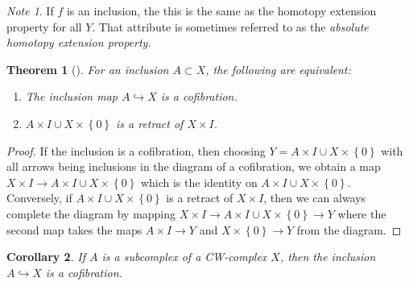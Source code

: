 \documentclass[reqno]{amsart}
\newtheorem{theorem}{Theorem}[section]
\newtheorem{corollary}[theorem]{Corollary}
\theoremstyle{definition}
\theoremstyle{remark}
\newtheorem*{note}{Note}
\begin{document}
\begin{note}
    If $f$ is an inclusion, the this is the same
    as the homotopy extension property for all $Y$. That attribute
    is sometimes referred to as the 
    \textit{absolute homotopy extension property}.
\end{note}

\begin{theorem}[]\label{Thm:Retract-cofibration}
    For an inclusion $A \subset X$, the following are equivalent:
    \begin{enumerate}
        \item The inclusion map $A \hookrightarrow X$ is a 
            cofibration.
        \item $A \times I \cup  X \times  \left\{ 0 \right\} $ 
            is a retract of $X \times I$.
    \end{enumerate}
\end{theorem}

\begin{proof}
    If the inclusion is a cofibration, then choosing
    $Y = A \times I \cup  X \times \left\{ 0 \right\} $ 
    with all arrows being inclusions in the
    diagram of a cofibration, we obtain a map
    $X \times I \to A \times I \cup  X \times \left\{ 0 \right\} $ 
    which is the identity on
    $A \times I \cup  X \times \left\{ 0 \right\} $.\\
    Conversely, if $A \times I \cup  X \times \left\{ 0 \right\} $ 
    is a retract of $X \times I$, then
    we can always complete the diagram by
    mapping $X \times I \to 
    A \times I \cup  X \times  \left\{ 0 \right\} 
    \to Y$ where the second map
    takes the maps $A \times I \to Y$ and
    $X \times \left\{ 0 \right\} \to Y$ from the diagram.
\end{proof}

\begin{corollary}\label{Cor:Subcomplex-Cofibration}
    If $A$ is a subcomplex of a CW-complex $X$, then
    the inclusion $A \hookrightarrow X$ is a cofibration.
\end{corollary}
\end{document}

